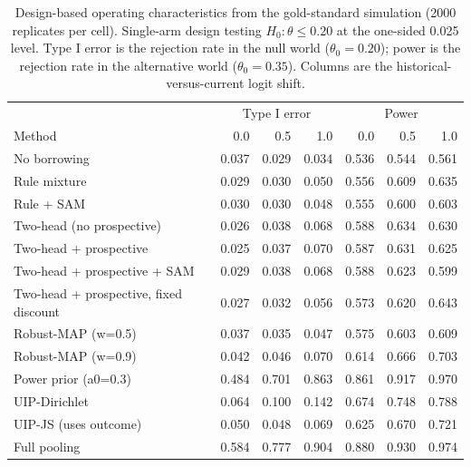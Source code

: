 \begin{table}[htbp]
\centering
\small
\caption{Design-based operating characteristics from the gold-standard simulation (2000 replicates per cell). Single-arm design testing $H_0\!:\theta \le 0.20$ at the one-sided 0.025 level. Type I error is the rejection rate in the null world ($\theta_0=0.20$); power is the rejection rate in the alternative world ($\theta_0=0.35$). Columns are the historical-versus-current logit shift.}
\label{tab:gold-standard-design-oc}
\begin{tabular}{lrrrrrr}
\toprule
& \multicolumn{3}{c}{Type I error} & \multicolumn{3}{c}{Power} \\
Method & 0.0 & 0.5 & 1.0 & 0.0 & 0.5 & 1.0 \\
\midrule
No borrowing & 0.037 & 0.029 & 0.034 & 0.536 & 0.544 & 0.561 \\
Rule mixture & 0.029 & 0.030 & 0.050 & 0.556 & 0.609 & 0.635 \\
Rule + SAM & 0.030 & 0.030 & 0.048 & 0.555 & 0.600 & 0.603 \\
Two-head (no prospective) & 0.026 & 0.038 & 0.068 & 0.588 & 0.634 & 0.630 \\
Two-head + prospective & 0.025 & 0.037 & 0.070 & 0.587 & 0.631 & 0.625 \\
Two-head + prospective + SAM & 0.029 & 0.038 & 0.068 & 0.588 & 0.623 & 0.599 \\
Two-head + prospective, fixed discount & 0.027 & 0.032 & 0.056 & 0.573 & 0.620 & 0.643 \\
Robust-MAP (w=0.5) & 0.037 & 0.035 & 0.047 & 0.575 & 0.603 & 0.609 \\
Robust-MAP (w=0.9) & 0.042 & 0.046 & 0.070 & 0.614 & 0.666 & 0.703 \\
Power prior (a0=0.3) & 0.484 & 0.701 & 0.863 & 0.861 & 0.917 & 0.970 \\
UIP-Dirichlet & 0.064 & 0.100 & 0.142 & 0.674 & 0.748 & 0.788 \\
UIP-JS (uses outcome) & 0.050 & 0.048 & 0.069 & 0.625 & 0.670 & 0.721 \\
Full pooling & 0.584 & 0.777 & 0.904 & 0.880 & 0.930 & 0.974 \\
\bottomrule
\end{tabular}
\end{table}
